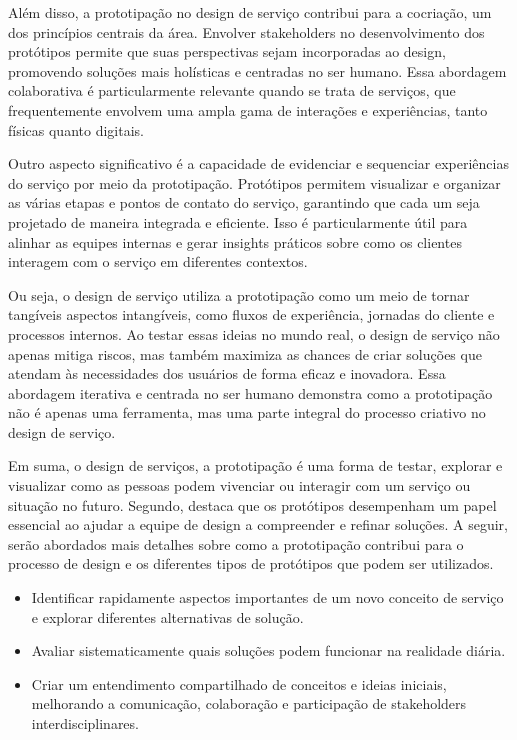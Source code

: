 Além disso, a prototipação no design de serviço contribui para a cocriação, um dos princípios centrais da área. Envolver stakeholders no desenvolvimento dos protótipos permite que suas perspectivas sejam incorporadas ao design, promovendo soluções mais holísticas e centradas no ser humano. Essa abordagem colaborativa é particularmente relevante quando se trata de serviços, que frequentemente envolvem uma ampla gama de interações e experiências, tanto físicas quanto digitais.

Outro aspecto significativo é a capacidade de evidenciar e sequenciar experiências do serviço por meio da prototipação. Protótipos permitem visualizar e organizar as várias etapas e pontos de contato do serviço, garantindo que cada um seja projetado de maneira integrada e eficiente. Isso é particularmente útil para alinhar as equipes internas e gerar insights práticos sobre como os clientes interagem com o serviço em diferentes contextos.

Ou seja, o design de serviço utiliza a prototipação como um meio de tornar tangíveis aspectos intangíveis, como fluxos de experiência, jornadas do cliente e processos internos. Ao testar essas ideias no mundo real, o design de serviço não apenas mitiga riscos, mas também maximiza as chances de criar soluções que atendam às necessidades dos usuários de forma eficaz e inovadora. Essa abordagem iterativa e centrada no ser humano demonstra como a prototipação não é apenas uma ferramenta, mas uma parte integral do processo criativo no design de serviço.

Em suma, o design de serviços, a prototipação é uma forma de testar, explorar e visualizar como as pessoas podem vivenciar ou interagir com um serviço ou situação no futuro. Segundo, \cite{Stickdorn2019} destaca que os protótipos desempenham um papel essencial ao ajudar a equipe de design a compreender e refinar soluções. A seguir, serão abordados mais detalhes sobre como a prototipação contribui para o processo de design e os diferentes tipos de protótipos que podem ser utilizados. 

\begin{itemize}
	\item Identificar rapidamente aspectos importantes de um novo conceito de serviço e explorar diferentes alternativas de solução.
	
	\item Avaliar sistematicamente quais soluções podem funcionar na realidade diária.
	
	\item Criar um entendimento compartilhado de conceitos e ideias iniciais, melhorando a comunicação, colaboração e participação de stakeholders interdisciplinares.
\end{itemize}

